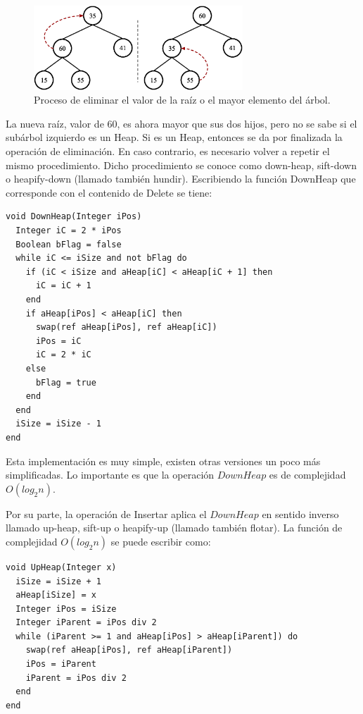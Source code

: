 \begin{figure}[htpb!]
  \begin{center}
    \includegraphics[width=0.7\textwidth]{images/heaptreedel2.eps}
  \end{center}
  \caption{Proceso de eliminar el valor de la raíz o el mayor elemento del árbol.}
  \label{fig:heaptreedel2}
\end{figure}

La nueva raíz, valor de 60, es ahora mayor que sus dos hijos, pero no se sabe si el subárbol izquierdo es un Heap. Si es un Heap, entonces se da por finalizada la operación de eliminación. En caso contrario, es necesario volver a repetir el mismo procedimiento. Dicho procedimiento se conoce como down-heap, sift-down o heapify-down (llamado también hundir). Escribiendo la función DownHeap que corresponde con el contenido de Delete se tiene:

\begin{lstlisting}[upquote=true, language=pseudo]
void DownHeap(Integer iPos)
  Integer iC = 2 * iPos
  Boolean bFlag = false
  while iC <= iSize and not bFlag do
    if (iC < iSize and aHeap[iC] < aHeap[iC + 1] then
      iC = iC + 1
    end
    if aHeap[iPos] < aHeap[iC] then
      swap(ref aHeap[iPos], ref aHeap[iC])
      iPos = iC
      iC = 2 * iC
    else
      bFlag = true
    end
  end
  iSize = iSize - 1
end
\end{lstlisting}

Esta implementación es muy simple, existen otras versiones un poco más simplificadas. Lo importante es que la operación $DownHeap$ es de complejidad $O(log_2n)$.

Por su parte, la operación de Insertar aplica el $DownHeap$ en sentido inverso llamado up-heap, sift-up o heapify-up (llamado también flotar). La función de complejidad $O(log_2n)$ se puede escribir como:

\begin{lstlisting}[upquote=true, language=pseudo]
void UpHeap(Integer x)
  iSize = iSize + 1
  aHeap[iSize] = x
  Integer iPos = iSize
  Integer iParent = iPos div 2
  while (iParent >= 1 and aHeap[iPos] > aHeap[iParent]) do
    swap(ref aHeap[iPos], ref aHeap[iParent])
	iPos = iParent
    iParent = iPos div 2
  end  
end
\end{lstlisting}

